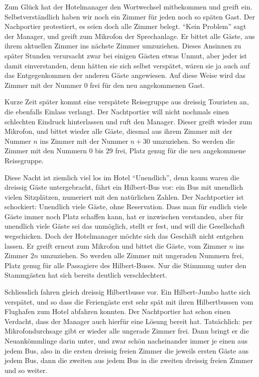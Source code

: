Zum Glück hat der Hotelmanager den Wortwechsel mitbekommen und greift
ein. Selbstverständlich haben wir noch ein Zimmer für jeden noch so
späten Gast. Der Nachportier protestiert, es seien doch alle Zimmer
belegt. ``Kein Problem'' sagt der Manager, und greift zum Mikrofon
der Sprechanlage. Er bittet alle Gäste, aus ihrem aktuellen Zimmer
ins nächste Zimmer umzuziehen. Dieses Ansinnen zu später Stunden
verursacht zwar bei einigen Gästen etwas Unmut, aber jeder ist damit
einverstanden, denn hätten sie sich selbst verspätet, wären sie ja
auch auf das Entgegenkommen der anderen Gäste angewiesen. Auf diese
Weise wird das Zimmer mit der Nummer $0$ frei für den neu angekommenen
Gast.

Kurze Zeit später kommt eine verspätete Reisegruppe aus dreissig
Touristen an, die ebenfalls
Einlass verlangt. Der Nachtportier will nicht nochmals einen schlechten
Eindruck hinterlassen und ruft den Manager. Dieser greift
wieder zum Mikrofon, und bittet wieder alle Gäste, diesmal aus
ihrem Zimmer mit der Nummer $n$ ins Zimmer mit der Nummer $n+30$
umzuziehen. So werden die Zimmer mit den Nummern $0$ bis $29$ frei,
Platz genug für die neu angekommene Reisegruppe.

Diese Nacht ist ziemlich viel los im Hotel ``Unendlich'', denn
kaum waren die dreissig Gäste untergebracht, fährt ein Hilbert-Bus
vor: ein Bus mit unendlich vielen Sitzplätzen, numeriert mit den
natürlichen Zahlen. Der Nachtportier ist schockiert: Unendlich
viele Gäste, ohne Reservation. Dass man für endlich viele Gäste
immer noch Platz schaffen kann, hat er inzwischen verstanden, aber
für unendlich viele Gäste sei das unmöglich, stellt er fest, und
will die Gesellschaft wegschicken. Doch der Hotelmanager möchte
sich das Geschäft nicht entgehen lassen. Er greift erneut zum
Mikrofon und bittet die Gäste, vom Zimmer $n$ ins Zimmer $2n$ umzuziehen.
So werden alle Zimmer mit ungeraden Nummern frei, Platz genug für alle
Passagiere des Hilbert-Buses. Nur die Stimmung unter den Stammgästen
hat sich bereits deutlich verschlechtert.

Schliesslich fahren gleich dreissig Hilbertbusse vor. Ein Hilbert-Jumbo
hatte sich verspätet, und so dass die Feriengäste erst sehr spät
mit ihren Hilbertbussen vom Flughafen zum Hotel abfahren konnten.
Der Nachtportier hat schon einen Verdacht, dass der Manager auch
hierfür eine Lösung bereit hat. Tatsächlich: per Mikrofondurchsage
gibt er wieder alle ungerade Zimmer frei. Dann bringt er die Neuankömmlinge
darin unter, und zwar schön nacheinander immer je einen aus jedem Bus,
also in die ersten dreissig freien Zimmer die jeweils ersten Gäste
aus jedem Bus, dann die zweiten aus jedem Bus in die zweiten dreissig
freien Zimmer und so weiter.

